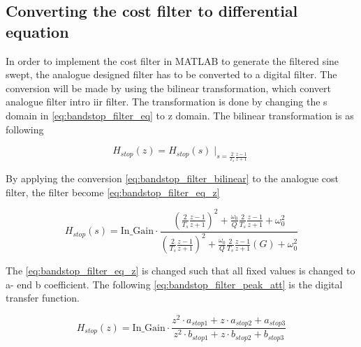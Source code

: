 \subsection{Converting the cost filter to differential equation}
In order to implement the cost filter in MATLAB to generate the filtered sine swept, the analogue designed filter has to be converted to a digital filter. The conversion will be made by using the bilinear transformation, which convert analogue filter intro \gls{iir} filter.  The transformation is done by changing the s domain in \autoref{eq:bandstop_filter_eq} to z domain. The bilinear transformation is as following 

\begin{equation}\label{eq:bandstop_filter_bilinear}
H_{stop}(z) = H_{stop}(s) \mid_{s=\frac{2}{T_s}\frac{z-1}{z+1}} 
\end{equation}

    \startexplain
    \stopexplain

By applying the conversion \autoref{eq:bandstop_filter_bilinear} to the analogue cost filter, the filter become \autoref{eq:bandstop_filter_eq_z}

\begin{equation}\label{eq:bandstop_filter_eq_z}
H_{stop}(s) = \text{In_Gain} \cdot \frac{(\frac{2}{T_s}\frac{z-1}{z+1})^2+\frac{\omega_0}{Q}\frac{2}{T_s}\frac{z-1}{z+1}+\omega_0^2}{(\frac{2}{T_s}\frac{z-1}{z+1})^2+\frac{\omega_0}{Q}\frac{2}{T_s}\frac{z-1}{z+1}(G)+\omega_0^2}
\end{equation}

The \autoref{eq:bandstop_filter_eq_z} is changed such that all fixed values is changed to a- end b coefficient. The following \autoref{eq:bandstop_filter_peak_att} is the digital transfer function.


\begin{equation}\label{eq:bandstop_filter_peak_att}
        H_{stop}(z) =  \text{In_Gain} \cdot \frac{z^2 \cdot a_{stop1} + z \cdot a_{stop2} + a_{stop3}}{z^2 \cdot b_{stop1} + z \cdot b_{stop2} + b_{stop3}}
    \end{equation}
    
    \startexplain
    \stopexplain

